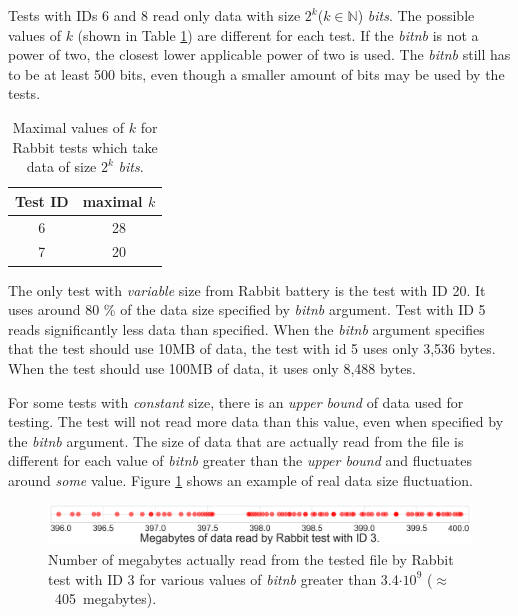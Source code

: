 \documentclass[
  digital,     %
  oneside,     %
  nosansbold,  %
  nocolorbold, %
  nolof,         %
  nolot,         %
]{fithesis4}
\begin{document}
Tests with IDs 6 and 8 read only data with size $2^k$($k \in \mathbb{N}$) \emph{bits}. The possible values of $k$ \cite{tu01_guide} (shown in Table \ref{tab:analysis_rabbit_two_powers}) are different for each test. If the \emph{bit\textunderscore nb} is not a power of two, the closest lower applicable power of two is used. The \emph{bit\textunderscore nb} still has to be at least 500 bits, even though a smaller amount of bits may be used by the tests.

\begin{table}[h]
  \begin{tabularx}{0.33\textwidth}{c|c}
    Test ID & maximal $k$\\
    \midrule
    6& 28\\
    7& 20\\
 
  \end{tabularx}
  \caption{Maximal values of $k$ for Rabbit tests which take data of size $2^k$ \emph{bits}.}
  \label{tab:analysis_rabbit_two_powers}
\end{table}

The only test with \emph{variable} size from Rabbit battery is the test with ID 20. It uses around 80 \% of the data size specified by \emph{bit\textunderscore nb} argument. Test with ID 5 reads significantly less data than specified. When the \emph{bit\textunderscore nb} argument specifies that the test should use 10MB of data, the test with id 5 uses only  3,536 bytes. When the test should use 100MB of data, it uses only 8,488 bytes.

For some tests with \emph{constant} size, there is an \emph{upper bound} of data used for testing. The test will not read more data than this value, even when specified by the \emph{bit\textunderscore nb} argument. The size of data that are actually read from the file is different for each value of \emph{bit\textunderscore nb} greater than the \emph{upper bound} and fluctuates around \emph{some} value. Figure \ref{fig:analysis-rabbit-max} shows an example of real data size fluctuation.

\begin{figure}[h]
  \begin{center}
    \includegraphics[width=12.7cm]{figures/rabbit_3_maxims.png}
  \end{center}
  \caption{Number of megabytes actually read from the tested file by Rabbit test with ID 3 for various values of \emph{bit\textunderscore nb} greater than 3.4$\cdot10^{9}$ ($\approx$~405~megabytes).}
  \label{fig:analysis-rabbit-max}
\end{figure}
\end{document}
